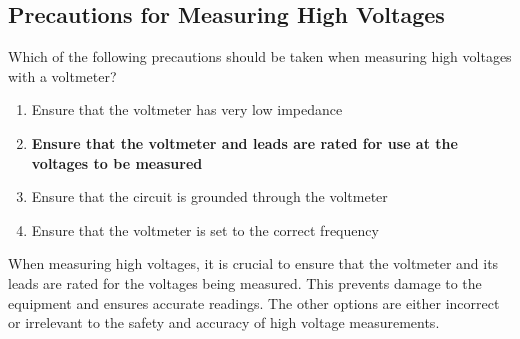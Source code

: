 \subsection{Precautions for Measuring High Voltages}
\label{T0A12}

\begin{tcolorbox}[colback=gray!10!white,colframe=black!75!black,title=T0A12]
Which of the following precautions should be taken when measuring high voltages with a voltmeter?
\begin{enumerate}[noitemsep]
    \item Ensure that the voltmeter has very low impedance
    \item \textbf{Ensure that the voltmeter and leads are rated for use at the voltages to be measured}
    \item Ensure that the circuit is grounded through the voltmeter
    \item Ensure that the voltmeter is set to the correct frequency
\end{enumerate}
\end{tcolorbox}

When measuring high voltages, it is crucial to ensure that the voltmeter and its leads are rated for the voltages being measured. This prevents damage to the equipment and ensures accurate readings. The other options are either incorrect or irrelevant to the safety and accuracy of high voltage measurements.